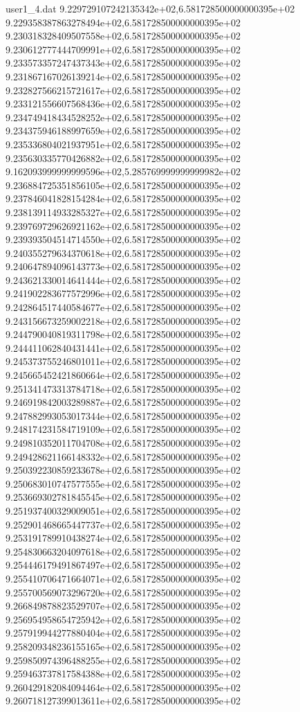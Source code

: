 \begin{filecontents}{user1_4.dat}
9.229729107242135342e+02,6.581728500000000395e+02
9.229358387863278494e+02,6.581728500000000395e+02
9.230318328409507558e+02,6.581728500000000395e+02
9.230612777444709991e+02,6.581728500000000395e+02
9.233573357247437343e+02,6.581728500000000395e+02
9.231867167026139214e+02,6.581728500000000395e+02
9.232827566215721617e+02,6.581728500000000395e+02
9.233121556607568436e+02,6.581728500000000395e+02
9.234749418434528252e+02,6.581728500000000395e+02
9.234375946188997659e+02,6.581728500000000395e+02
9.235336804021937951e+02,6.581728500000000395e+02
9.235630335770426882e+02,6.581728500000000395e+02
9.162093999999999596e+02,5.285769999999999982e+02
9.236884725351856105e+02,6.581728500000000395e+02
9.237846041828154284e+02,6.581728500000000395e+02
9.238139114933285327e+02,6.581728500000000395e+02
9.239769729626921162e+02,6.581728500000000395e+02
9.239393504514714550e+02,6.581728500000000395e+02
9.240355279634370618e+02,6.581728500000000395e+02
9.240647894096143773e+02,6.581728500000000395e+02
9.243621330014641444e+02,6.581728500000000395e+02
9.241902283677572996e+02,6.581728500000000395e+02
9.242864517440584677e+02,6.581728500000000395e+02
9.243156673259002218e+02,6.581728500000000395e+02
9.244790040819311798e+02,6.581728500000000395e+02
9.244411062840431441e+02,6.581728500000000395e+02
9.245373755246801011e+02,6.581728500000000395e+02
9.245665452421860664e+02,6.581728500000000395e+02
9.251341473313784718e+02,6.581728500000000395e+02
9.246919842003289887e+02,6.581728500000000395e+02
9.247882993053017344e+02,6.581728500000000395e+02
9.248174231584719109e+02,6.581728500000000395e+02
9.249810352011704708e+02,6.581728500000000395e+02
9.249428621166148332e+02,6.581728500000000395e+02
9.250392230859233678e+02,6.581728500000000395e+02
9.250683010747577555e+02,6.581728500000000395e+02
9.253669302781845545e+02,6.581728500000000395e+02
9.251937400329009051e+02,6.581728500000000395e+02
9.252901468665447737e+02,6.581728500000000395e+02
9.253191789910438274e+02,6.581728500000000395e+02
9.254830663204097618e+02,6.581728500000000395e+02
9.254446179491867497e+02,6.581728500000000395e+02
9.255410706471664071e+02,6.581728500000000395e+02
9.255700569073296720e+02,6.581728500000000395e+02
9.266849878823529707e+02,6.581728500000000395e+02
9.256954958654725942e+02,6.581728500000000395e+02
9.257919944277880404e+02,6.581728500000000395e+02
9.258209348236155165e+02,6.581728500000000395e+02
9.259850974396488255e+02,6.581728500000000395e+02
9.259463737817584388e+02,6.581728500000000395e+02
9.260429182084094464e+02,6.581728500000000395e+02
9.260718127399013611e+02,6.581728500000000395e+02

\end{filecontents}
